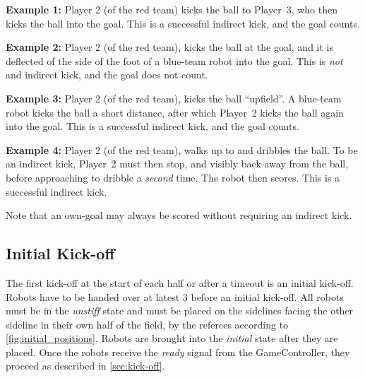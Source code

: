 \textbf{Example 1:} Player 2 (of the red team) kicks the ball to Player~3, who then kicks the ball into the goal. This is a successful indirect kick, and the goal counts.

\textbf{Example 2:} Player 2 (of the red team), kicks the ball at the goal, and it is deflected of the side of the foot of a blue-team robot into the goal. This is \textit{not} and indirect kick, and the goal does not count.

\textbf{Example 3:} Player 2 (of the red team), kicks the ball ``upfield''. A blue-team robot kicks the ball a short distance, after which Player~2 kicks the ball again into the goal. This is a successful indirect kick, and the goal counts.

\textbf{Example 4:} Player 2 (of the red team), walks up to and dribbles the ball. To be an indirect kick, Player~2 must then stop, and visibly back-away from the ball, before approaching to dribble a \textit{second} time. The robot then scores. This is a successful indirect kick.

Note that an own-goal may always be scored without requiring an indirect kick.

\subsection{Initial Kick-off}
\label{sec:initial-kick-off}

The first kick-off at the start of each half or after a timeout is an initial kick-off.
Robots have to be handed over at latest \qty{3}{\min} before an initial kick-off. All robots must be in the \textit{unstiff} state and must be placed on the sidelines facing the other sideline in their own half of the field, by the referees according to \cref{fig:initial_positions}. Robots are brought into the \textit{initial} state after they are placed. Once the robots receive the \emph{ready} signal from the GameController, they proceed as described in \cref{sec:kick-off}.

